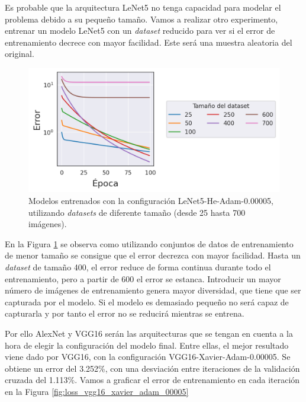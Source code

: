 Es probable que la arquitectura LeNet5 no tenga capacidad para modelar el problema debido a su pequeño tamaño. Vamos a realizar otro experimento, entrenar un modelo LeNet5 con un \textit{dataset} reducido para ver si el error de entrenamiento decrece con mayor facilidad. Este será una muestra aleatoria del original.

\begin{figure}[H]
\centering
    \includegraphics[scale=0.64]{imagenes/image_classification/original_dataset/loss_smalldataset.png}
    \caption{Modelos entrenados con la configuración LeNet5-He-Adam-0.00005, utilizando \textit{datasets} de diferente tamaño (desde 25 hasta 700 imágenes).}
    \label{fig:loss-smalldataset}
\end{figure}

En la Figura \ref{fig:loss-smalldataset} se observa como utilizando conjuntos de datos de entrenamiento de menor tamaño se consigue que el error decrezca con mayor facilidad. Hasta un \textit{dataset} de tamaño 400, el error reduce de forma continua durante todo el entrenamiento, pero a partir de 600 el error se estanca. Introducir un mayor número de imágenes de entrenamiento genera mayor diversidad, que tiene que ser capturada por el modelo. Si el modelo es demasiado pequeño no será capaz de capturarla y por tanto el error no se reducirá mientras se entrena.

Por ello AlexNet y VGG16 serán las arquitecturas que se tengan en cuenta a la hora de elegir la configuración del modelo final. Entre ellas, el mejor resultado viene dado por VGG16, con la configuración VGG16-Xavier-Adam-0.00005. Se obtiene un error del 3.252\%, con una desviación entre iteraciones de la validación cruzada del 1.113\%. Vamos a graficar el error de entrenamiento en cada iteración en la Figura \ref{fig:loss_vgg16_xavier_adam_00005}

